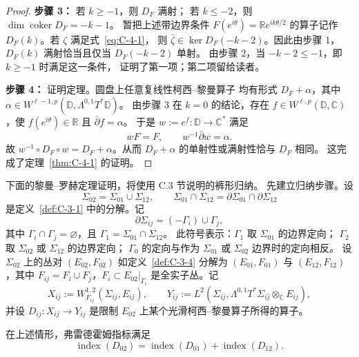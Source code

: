 \begin{proof}
\noindent\textbf{步骤 3：} 若 $k\ge-1$，则 $D_F$ 满射；
若 $k\le-2$，则 $\dim\operatorname{coker}D_F=-k-1$。
暂把上述带边界条件 $F(e^{i\theta})=\mathbb R e^{ik\theta/2}$
的算子记作 $D_F(k)$。若 $\zeta$ 满足式~\eqref{eq:C-4-1}，
则 $\bar\zeta\in\ker D_F(-k-2)$。因此由步骤 1，
$D_F(k)$ 满射恰当且仅当 $D_F(-k-2)$ 单射。
由步骤 2，当 $-k-2\le-1$，即 $k\ge-1$ 时满足这一条件，
证明了第一项；第二项留给读者。

\noindent\textbf{步骤 4：} 证明定理。圆盘上任意复线性柯西--黎曼算子
均有形式 $D_F+\alpha$，其中
$\alpha\in W^{\ell-1,p}(\mathbb D,\Lambda^{0,1}T^*\mathbb D)$。
由步骤 3 在 $k=0$ 的结论，存在
$f\in W^{\ell,p}(\mathbb D,\mathbb C)$，使
$f(e^{i\theta})\in\mathbb R$ 且 $\bar\partial f=\alpha$。
于是 $w:=e^f:\mathbb D\to\mathbb C^*$ 满足
\[
  wF=F,\qquad w^{-1}\bar\partial w=\alpha.
\]
故 $w^{-1}\circ D_F\circ w=D_F+\alpha$。从而
$D_F+\alpha$ 的单射性或满射性恰与 $D_F$ 相同。
这完成了定理~\ref{thm:C-4-1} 的证明。
\end{proof}

下面的黎曼--罗赫定理证明，将使用 C.3 节说明的裤形归纳。
先建立归纳步骤。设
\[
  \Sigma_{02}=\Sigma_{01}\cup\Sigma_{12},\qquad
  \Sigma_{01}\cap\Sigma_{12}=\partial\Sigma_{01}\cap\partial\Sigma_{12}
\]
是定义~\ref{def:C-3-1} 中的分解。记
\[
  \partial\Sigma_{ij}=(-\Gamma_i)\cup\Gamma_j,
\]
其中 $\Gamma_i\cap\Gamma_j=\varnothing$，且
$\Gamma_1=\Sigma_{01}\cap\Sigma_{12}$。
此符号表示：$\Gamma_1$ 取 $\Sigma_{01}$ 的边界定向；
$\Gamma_2$ 取 $\Sigma_{02}$ 或 $\Sigma_{12}$ 的边界定向；
$\Gamma_0$ 的定向与作为 $\Sigma_{01}$ 或 $\Sigma_{02}$ 边界时的定向相反。
设 $\Sigma_{02}$ 上的丛对 $(E_{02},F_{02})$ 如定义~\ref{def:C-3-4}
分解为 $(E_{01},F_{01})$ 与 $(E_{12},F_{12})$，其中
$F_{ij}=F_i\cup F_j$，$F_i\subset E_{02}|_{\Gamma_i}$ 是全实子丛。记
\[
  X_{ij}:=W_{F_{ij}}^{1,2}(\Sigma_{ij},E_{ij}),\qquad
  Y_{ij}:=L^2(\Sigma_{ij},\Lambda^{0,1}T^*\Sigma_{ij}\otimes_{\mathbb C}E_{ij}),
\]
并设 $D_{ij}:X_{ij}\to Y_{ij}$ 是限制 $E_{02}$ 上某个光滑柯西--黎曼算子所得的算子。

\begin{theorem}\label{thm:C-4-2}
在上述情形，弗雷德霍姆指标满足
\begin{equation}\label{eq:C-4-2}
  \operatorname{index}(D_{02})
  =\operatorname{index}(D_{01})+\operatorname{index}(D_{12}).
\end{equation}
\end{theorem}

